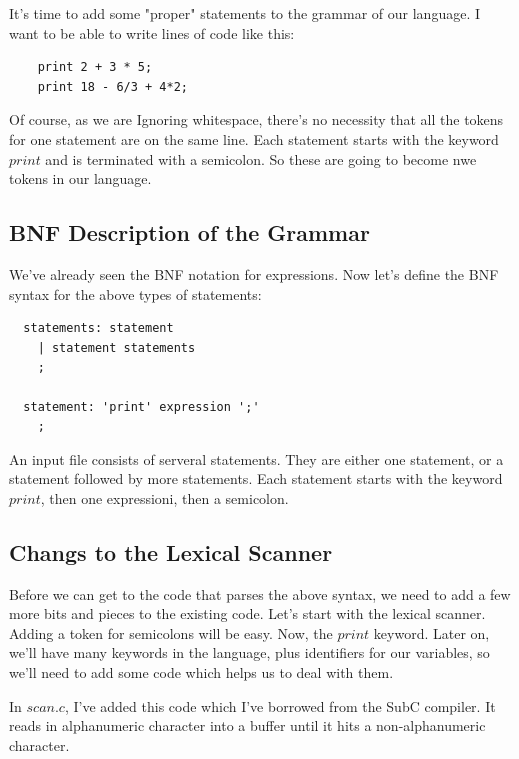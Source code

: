 \documentclass[journal, onecolumn, 12pt]{IEEEtran}
\begin{document}
It's time to add some "proper" statements to the grammar of our language. I want to be able to write lines of code like this:

\begin{lstlisting}
    print 2 + 3 * 5;
    print 18 - 6/3 + 4*2;
\end{lstlisting}

Of course, as we are Ignoring whitespace, there's no necessity that all the tokens for one statement are on the same line. Each statement starts with the keyword $print$ and is terminated with a semicolon. So these are going to become nwe tokens in our language.

\subsection{BNF Description of the Grammar}

We've already seen the BNF notation for expressions. Now let's define the BNF syntax for the above types of statements:

\begin{lstlisting}
  statements: statement
    | statement statements
    ;

  statement: 'print' expression ';'
    ;
\end{lstlisting}

An input file consists of serveral statements. They are either one statement, or a statement followed by more statements. Each statement starts with the keyword $print$, then one expressioni, then a semicolon.

\subsection{Changs to the Lexical Scanner}

Before we can get to the code that parses the above syntax, we need to add a few more bits and pieces to the existing code. Let's start with the lexical scanner. Adding a token for semicolons will be easy. Now, the $print$ keyword. Later on, we'll have many keywords in the language, plus identifiers for our variables, so we'll need to add some code which helps us to deal with them.

In $scan.c$, I've added this code which I've borrowed from the SubC compiler. It reads in alphanumeric character into a buffer until it hits a non-alphanumeric character.
\end{document}
